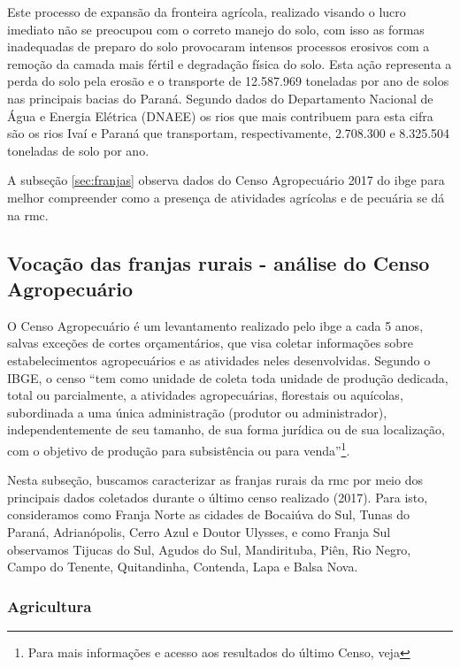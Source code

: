 	\begin{citacao}
		Este processo de expansão da fronteira agrícola, realizado visando o lucro imediato não se preocupou com o correto manejo do solo, com isso as formas inadequadas de preparo do solo provocaram intensos processos erosivos com a remoção da camada mais fértil e degradação física do solo. Esta ação representa a perda do solo pela erosão e o transporte de 12.587.969 toneladas por ano de solos nas principais bacias do Paraná. Segundo dados do Departamento Nacional de Água e Energia Elétrica (DNAEE) os rios que mais contribuem para esta cifra são os rios Ivaí e Paraná que transportam, respectivamente, 2.708.300 e 8.325.504 toneladas de solo por ano.
	\end{citacao}

	A subseção \autoref{sec:franjas} observa dados do Censo Agropecuário 2017 do \glsdesc{ibge} para melhor compreender como a presença de atividades agrícolas e de pecuária se dá na \glsdesc{rmc}.
	
	\subsection{Vocação das franjas rurais - análise do Censo Agropecuário} \label{sec:franjas}
	
	O Censo Agropecuário é um levantamento realizado pelo \gls{ibge} a cada 5 anos, salvas exceções de cortes orçamentários, que visa coletar informações sobre estabelecimentos agropecuários e as atividades neles desenvolvidas. Segundo o IBGE, o censo ``tem como unidade de coleta toda unidade de produção dedicada, total ou parcialmente, a atividades agropecuárias, florestais ou aquícolas, subordinada a uma única administração (produtor ou administrador), independentemente de seu tamanho, de sua forma jurídica ou de sua localização, com o objetivo de produção para subsistência ou para venda''\footnote{Para mais informações e acesso aos resultados do último Censo, veja }.
	
	Nesta subseção, buscamos caracterizar as franjas rurais da \gls{rmc} por meio dos principais dados coletados durante o último censo realizado (2017). Para isto, consideramos como Franja Norte as cidades de Bocaiúva do Sul, Tunas do Paraná, Adrianópolis, Cerro Azul e Doutor Ulysses, e como Franja Sul observamos Tijucas do Sul, Agudos do Sul, Mandirituba, Piên, Rio Negro, Campo do Tenente, Quitandinha, Contenda, Lapa e Balsa Nova.
	
	\subsubsection{Agricultura}
	
